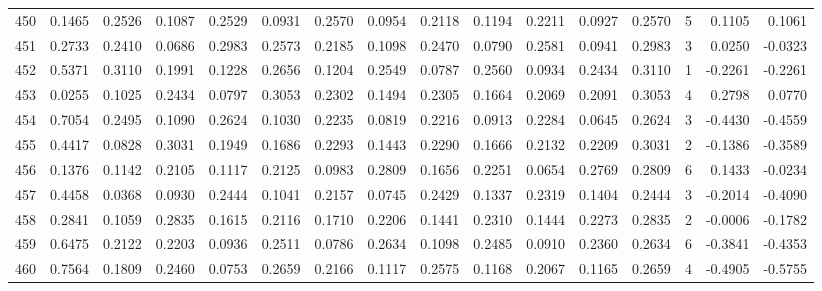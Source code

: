 \begin{tabular}{lrrrrrrrrrrrrrrr}
450 &      0.1465 &  0.2526 &  0.1087 &  0.2529 &  0.0931 &  0.2570 &  0.0954 &  0.2118 &  0.1194 &  0.2211 &   0.0927 &     0.2570 &      5 &                    0.1105 &                     0.1061 \\
451 &      0.2733 &  0.2410 &  0.0686 &  0.2983 &  0.2573 &  0.2185 &  0.1098 &  0.2470 &  0.0790 &  0.2581 &   0.0941 &     0.2983 &      3 &                    0.0250 &                    -0.0323 \\
452 &      0.5371 &  0.3110 &  0.1991 &  0.1228 &  0.2656 &  0.1204 &  0.2549 &  0.0787 &  0.2560 &  0.0934 &   0.2434 &     0.3110 &      1 &                   -0.2261 &                    -0.2261 \\
453 &      0.0255 &  0.1025 &  0.2434 &  0.0797 &  0.3053 &  0.2302 &  0.1494 &  0.2305 &  0.1664 &  0.2069 &   0.2091 &     0.3053 &      4 &                    0.2798 &                     0.0770 \\
454 &      0.7054 &  0.2495 &  0.1090 &  0.2624 &  0.1030 &  0.2235 &  0.0819 &  0.2216 &  0.0913 &  0.2284 &   0.0645 &     0.2624 &      3 &                   -0.4430 &                    -0.4559 \\
455 &      0.4417 &  0.0828 &  0.3031 &  0.1949 &  0.1686 &  0.2293 &  0.1443 &  0.2290 &  0.1666 &  0.2132 &   0.2209 &     0.3031 &      2 &                   -0.1386 &                    -0.3589 \\
456 &      0.1376 &  0.1142 &  0.2105 &  0.1117 &  0.2125 &  0.0983 &  0.2809 &  0.1656 &  0.2251 &  0.0654 &   0.2769 &     0.2809 &      6 &                    0.1433 &                    -0.0234 \\
457 &      0.4458 &  0.0368 &  0.0930 &  0.2444 &  0.1041 &  0.2157 &  0.0745 &  0.2429 &  0.1337 &  0.2319 &   0.1404 &     0.2444 &      3 &                   -0.2014 &                    -0.4090 \\
458 &      0.2841 &  0.1059 &  0.2835 &  0.1615 &  0.2116 &  0.1710 &  0.2206 &  0.1441 &  0.2310 &  0.1444 &   0.2273 &     0.2835 &      2 &                   -0.0006 &                    -0.1782 \\
459 &      0.6475 &  0.2122 &  0.2203 &  0.0936 &  0.2511 &  0.0786 &  0.2634 &  0.1098 &  0.2485 &  0.0910 &   0.2360 &     0.2634 &      6 &                   -0.3841 &                    -0.4353 \\
460 &      0.7564 &  0.1809 &  0.2460 &  0.0753 &  0.2659 &  0.2166 &  0.1117 &  0.2575 &  0.1168 &  0.2067 &   0.1165 &     0.2659 &      4 &                   -0.4905 &                    -0.5755 \\

\end{tabular}
